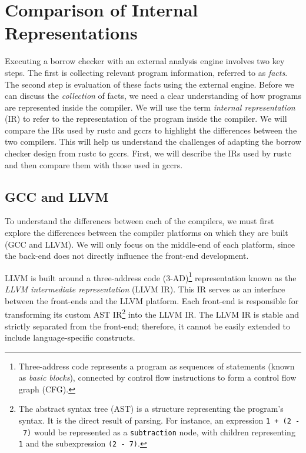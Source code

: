 \documentclass[
  11pt,
  twoside,symmetric]{report}
\begin{document}
\chapter{Comparison of Internal
Representations}\label{sec:comparison-of-internal-representations}

Executing a borrow checker with an external analysis engine involves two
key steps. The first is collecting relevant program information,
referred to as \emph{facts}. The second step is evaluation of these
facts using the external engine. Before we can discuss the
\emph{collection} of facts, we need a clear understanding of how
programs are represented inside the compiler. We will use the term
\emph{internal representation} (IR) to refer to the representation of
the program inside the compiler. We will compare the IRs used by rustc
and gccrs to highlight the differences between the two compilers. This
will help us understand the challenges of adapting the borrow checker
design from rustc to gccrs. First, we will describe the IRs used by
rustc and then compare them with those used in gccrs.

\section{GCC and LLVM}\label{sec:gcc-and-llvm}

To understand the differences between each of the compilers, we must
first explore the differences between the compiler platforms on which
they are built (GCC and LLVM). We will only focus on the middle-end of
each platform, since the back-end does not directly influence the
front-end development.

LLVM is built around a three-address code (3-AD)\footnote{Three-address
  code represents a program as sequences of statements (known as
  \emph{basic blocks}), connected by control flow instructions to form a
  control flow graph (CFG).} representation known as the \emph{LLVM
intermediate representation} (LLVM IR).
This IR serves as an interface between the front-ends and the LLVM
platform. Each front-end is responsible for transforming its custom AST
IR\footnote{The abstract syntax tree (AST) is a structure representing
  the program's syntax. It is the direct result of parsing. For
  instance, an expression \texttt{1\ +\ (2\ -\ 7)} would be represented
  as a \texttt{subtraction} node, with children representing \texttt{1}
  and the subexpression \texttt{(2\ -\ 7)}.} into the LLVM IR. The LLVM
IR is stable and strictly separated from the front-end; therefore, it
cannot be easily extended to include language-specific constructs.
\end{document}
